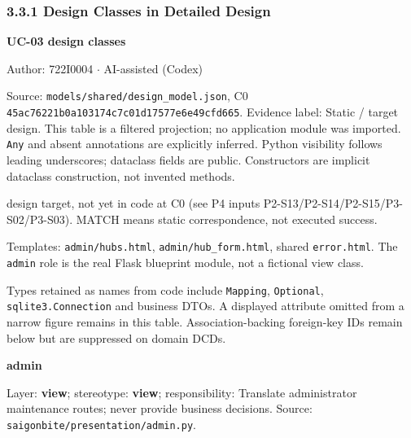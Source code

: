 \subsubsection*{3.3.1 Design Classes in Detailed Design}
\textbf{UC-03 design classes}

Author: 722I0004 \ensuremath{\cdot} AI-assisted (Codex)

Source: \texttt{models/\allowbreak{}shared/\allowbreak{}design\_\allowbreak{}model.\allowbreak{}json}, C0 \texttt{45ac76221b0a103174c7c01d17577e6e49cfd665}. Evidence label: Static / target design. This table is a filtered projection; no application module was imported. \texttt{Any} and absent annotations are explicitly inferred. Python visibility follows leading underscores; dataclass fields are public. Constructors are implicit dataclass construction, not invented methods.

design target, not yet in code at C0 (see P4 inputs P2-S13/P2-S14/P2-S15/P3-S02/P3-S03). MATCH means static correspondence, not executed success.

Templates: \texttt{admin/\allowbreak{}hubs.\allowbreak{}html}, \texttt{admin/\allowbreak{}hub\_\allowbreak{}form.\allowbreak{}html}, shared \texttt{error.\allowbreak{}html}. The \texttt{admin} role is the real Flask blueprint module, not a fictional view class.

Types retained as names from code include \texttt{Mapping}, \texttt{Optional}, \texttt{sqlite3.\allowbreak{}Connection} and business DTOs. A displayed attribute omitted from a narrow figure remains in this table. Association-backing foreign-key IDs remain below but are suppressed on domain DCDs.

\textbf{admin}

Layer: \textbf{view}; stereotype: \textbf{\guillemotleft{}view\guillemotright{}}; responsibility: Translate administrator maintenance routes; never provide business decisions. Source: \texttt{saigonbite/\allowbreak{}presentation/\allowbreak{}admin.\allowbreak{}py}.

